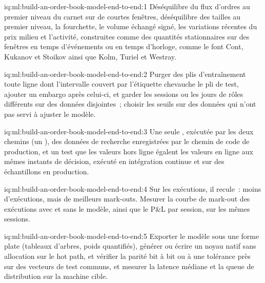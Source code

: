 \begin{solution}{iq:ml:build-an-order-book-model-end-to-end:1}
Déséquilibre du flux d'ordres au premier niveau du carnet sur de courtes fenêtres, déséquilibre des tailles au premier niveau, la fourchette, le volume échangé signé, les variations récentes du prix milieu
et l'activité, construites comme des quantités stationnaires sur des fenêtres en temps d'événements ou en temps d'horloge, comme le font Cont, Kukanov et Stoikov
ainsi que Kolm, Turiel et Westray.
\end{solution}

\begin{solution}{iq:ml:build-an-order-book-model-end-to-end:2}
Purger des plis d'entraînement toute ligne dont l'intervalle couvert par l'étiquette chevauche le pli de test, ajouter un embargo après celui-ci, et garder les sessions ou les jours de rôles différents sur des données disjointes~;
choisir les seuils sur des données qui n'ont pas servi à ajuster le modèle.
\end{solution}

\begin{solution}{iq:ml:build-an-order-book-model-end-to-end:3}
Une seule , exécutée par les deux chemins (un ), des données de recherche enregistrées par le chemin de code de production, et un
test que les valeurs hors ligne égalent les valeurs en ligne aux mêmes instants de décision, exécuté en intégration continue et sur des échantillons en production.
\end{solution}

\begin{solution}{iq:ml:build-an-order-book-model-end-to-end:4}
Sur les exécutions, il recule~: moins d'exécutions, mais de meilleurs mark-outs. Mesurer la courbe de mark-out des exécutions avec et sans le modèle, ainsi que le
P\&L par session, sur les mêmes sessions.
\end{solution}

\begin{solution}{iq:ml:build-an-order-book-model-end-to-end:5}
Exporter le modèle sous une forme plate (tableaux d'arbres, poids quantifiés), générer ou écrire un noyau natif sans allocation sur le hot path, et
vérifier la parité bit à bit ou à une tolérance près sur des vecteurs de test communs, et mesurer la latence médiane et la queue de distribution sur la machine cible.
\end{solution}

